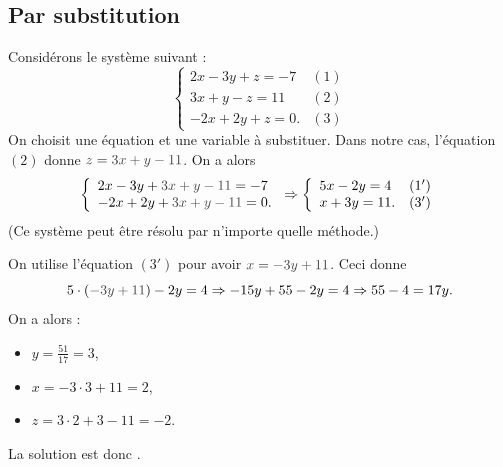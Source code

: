             \subsection{Par substitution}
			Consid\'erons le syst\`eme suivant :
				\[
					\left\lbrace
						\begin{array}{lc}
							  2 x - 3 y + z = -7  & (1) \\
							  3 x +   y - z = 11  & (2) \\
							- 2 x + 2 y + z =  0. & (3)
						\end{array}
					\right.
				\]
			On choisit une \'equation et une variable \`a substituer.
			Dans notre cas, l'\'equation $(2)$ donne $\textcolor{loko1}{z} = \textcolor{loko1}{3 x + y - 11}$.
			On a alors 
				\[
					\left\lbrace
						\begin{array}{l}
							  2 x - 3 y + \textcolor{loko1}{3 x + y - 11} = -7  \\
							- 2 x + 2 y + \textcolor{loko1}{3 x + y - 11} =  0. 
						\end{array}
					\right.
					\Rightarrow
					\left\lbrace
						\begin{array}{lc}
							5 x - 2 y =  4  & (1') \\
							  x + 3 y = 11. & (3')
						\end{array}
					\right.
				\]
			(Ce syst\`eme peut \^etre r\'esolu par n'importe quelle m\'ethode.)
			
			On utilise l'\'equation $(3')$ pour avoir $\textcolor{loko1}{x} = \textcolor{loko1}{-3y+11}$.
			Ceci donne 
			      \[ 
			            5 \cdot (\textcolor{loko1}{-3y+11}) - 2 y = 4
			            \Rightarrow
			            -15 y + 55 - 2y = 4
			            \Rightarrow
			            55 - 4 = 17 y .
			      \]
			On a alors :
			\begin{itemize}
			      \item $y = \frac{51}{17} = 3$,
			      \item $x = -3 \cdot 3 + 11 = 2$,
			      \item $z = 3 \cdot 2 + 3 - 11 = -2$.
			\end{itemize}
			La solution est donc .
